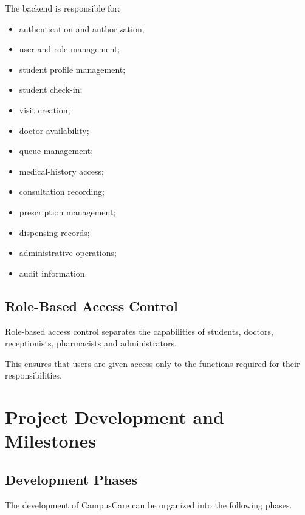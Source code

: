 \documentclass{tietreport}
\begin{document}
The backend is responsible for:

\begin{itemize}
    \item authentication and authorization;
    \item user and role management;
    \item student profile management;
    \item student check-in;
    \item visit creation;
    \item doctor availability;
    \item queue management;
    \item medical-history access;
    \item consultation recording;
    \item prescription management;
    \item dispensing records;
    \item administrative operations;
    \item audit information.
\end{itemize}

\section{Role-Based Access Control}

Role-based access control separates the capabilities of students,
doctors, receptionists, pharmacists and administrators.

This ensures that users are given access only to the functions
required for their responsibilities.



\chapter{Project Development and Milestones}

\section{Development Phases}

The development of CampusCare can be organized into the following
phases.
\end{document}
